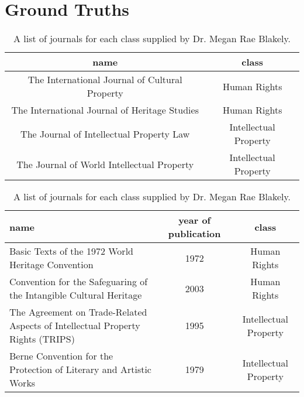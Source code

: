 \appendix
	\chapter{Ground Truths}
		\begin{table}
			\centering
			\begin{tabular}{c|c}
				\hline
				name&class\\
				\hline
				The International Journal of Cultural Property&Human Rights\\
				The International Journal of Heritage Studies&Human Rights\\
				The Journal of Intellectual Property Law&Intellectual Property\\
				The Journal of World Intellectual Property&Intellectual Property
			\end{tabular}
			\caption{A list of journals for each class supplied by Dr. Megan Rae Blakely.}\label{tab:journal-list}
		\end{table}
		\begin{table}
			\centering
			\begin{tabular}{p{8cm}|c|c}
				\hline
				name&year of publication&class\\
				\hline
				Basic Texts of the 1972 World Heritage Convention&1972&Human Rights\\
				Convention for the Safeguaring of the Intangible Cultural Heritage&2003&Human Rights\\
				The Agreement on Trade-Related Aspects of Intellectual Property Rights (TRIPS)&1995&Intellectual Property\\
				Berne Convention for the Protection of Literary and Artistic Works&1979&Intellectual Property
			\end{tabular}
			\caption{A list of journals for each class supplied by Dr. Megan Rae Blakely.}\label{tab:treaty-list}
		\end{table}
